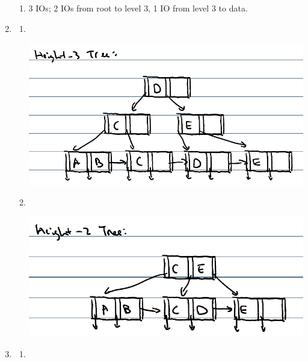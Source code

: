 \documentclass{article}
\begin{document}
\begin{enumerate}
\begin{enumerate}
                  \item 3 IOs; 2 IOs from root to level 3, 1 IO from level 3 to data.
            \end{enumerate}
      \item
            \begin{enumerate}
                  \item  $ $
                        \begin{center}
                              \includegraphics{7a.png}
                        \end{center}
                  \item $ $
                        \begin{center}
                              \includegraphics{7b.png}
                        \end{center}
            \end{enumerate}
      \item
            \begin{enumerate}
                  \item $ $
                        \begin{center}

\end{center}
\end{enumerate}
\end{enumerate}
\end{document}
